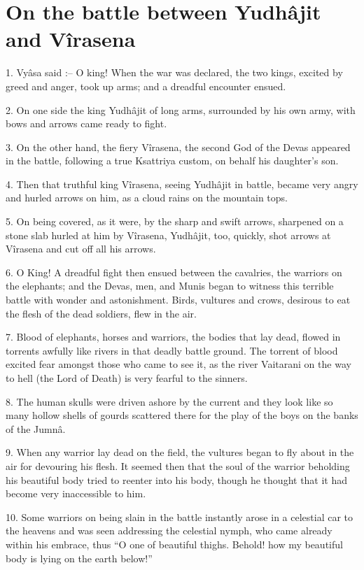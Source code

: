 ﻿\chapter{On the battle between Yudh\^ajit and V\^irasena}

1. Vy\^asa said :-- O king! When the war was declared, the two kings, excited by greed and anger, took up arms; and a dreadful encounter ensued.

2. On one side the king Yudh\^ajit of long arms, surrounded by his own army, with bows and arrows came ready to fight.

3. On the other hand, the fiery V\^irasena, the second God of the Devas appeared in the battle, following a true Ksattriya custom, on behalf his daughter's son.

4. Then that truthful king V\^irasena, seeing Yudh\^ajit in battle, became very angry and hurled arrows on him, as a cloud rains on the mountain tops.

5. On being covered, as it were, by the sharp and swift arrows, sharpened on a stone slab hurled at him by V\^irasena, Yudh\^ajit, too, quickly, shot arrows at V\^irasena and cut off all his arrows.

6. O King! A dreadful fight then ensued between the cavalries, the warriors on the elephants; and the Devas, men, and Munis began to witness this terrible battle with wonder and astonishment. Birds, vultures and crows, desirous to eat the flesh of the dead soldiers, flew in the air.

7. Blood of elephants, horses and warriors, the bodies that lay dead, flowed in torrents awfully like rivers in that deadly battle ground. The torrent of blood excited fear amongst those who came to see it, as the river Vaitarani on the way to hell (the Lord of Death) is very fearful to the sinners.

8. The human skulls were driven ashore by the current and they look like so many hollow shells of gourds scattered there for the play of the boys on the banks of the Jumn\^a.

9. When any warrior lay dead on the field, the vultures began to fly about in the air for devouring his flesh. It seemed then that the soul of the warrior beholding his beautiful body tried to reenter into his body, though he thought that it had become very inaccessible to him.

10. Some warriors on being slain in the battle instantly arose in a celestial car to the heavens and was seen addressing the celestial nymph, who came already within his embrace, thus ``O one of beautiful thighs. Behold! how my beautiful body is lying on the earth below!''

